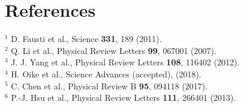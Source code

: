 \documentclass[11pt,a4paper]{article}
\begin{document}
\section*{References}
\noindent
$^1$ D. Fausti et al., Science {\bf 331}, 189 (2011).\\
$^2$ Q. Li et al.,  Physical Review Letters {\bf99}, 067001 (2007).\\
$^3$ J. J. Yang et al., Physical Review Letters {\bf 108}, 116402 (2012).\\
$^4$ H. Oike et al., Science Advances (accepted), (2018).\\
$^5$ C. Chen et al., Physical Review B {\bf 95}, 094118 (2017).\\
$^6$ P.-J. Hsu et al., Physical Review Letters {\bf 111}, 266401 (2013).\\
\end{document}
